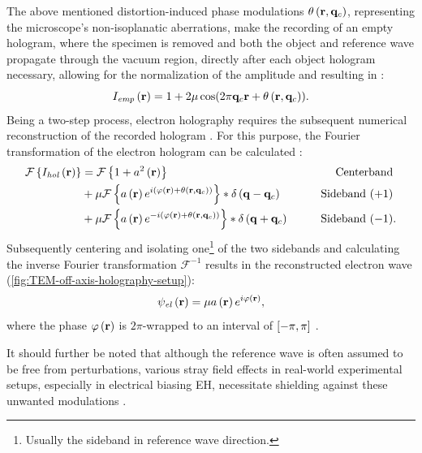 The above mentioned distortion-induced phase modulations $\theta\left(\vb{r}, \vb{q}_c\right)$, representing the microscope's non-isoplanatic aberrations, make the recording of an empty hologram, where the specimen is removed and both the object and reference wave propagate through the vacuum region, directly after each object hologram necessary, allowing for the normalization of the amplitude and resulting in \cite{Voelkl1999,Lehmann2002,Lichte2008}:
\begin{equation}
  I_{\mathit{emp}}\left(\vb{r}\right) = 1 + 2\mu \cos(2\pi \vb{q}_c \vb{r} + \theta\left(\vb{r}, \vb{q}_c\right)).
\end{equation}
Being a two-step process, electron holography requires the subsequent numerical reconstruction of the recorded hologram \cite{Voelkl1999,Lehmann2002,Lichte2008}. For this purpose, the Fourier transformation of the electron hologram can be calculated \cite{Lehmann1994,Voelkl1995,Voelkl1999,Lehmann2002,Lichte2008}:
	\begin{alignat}{3}
		\mathcal{F}\left\{ I_{\mathit{hol}}\left(\vb{r}\right) \right\} &= \mathcal{F}\left\{ 1 + a^2\left(\vb{r}\right) \right\} &\qquad\text{Centerband}& \notag \\
		&+ \mu \mathcal{F}\left\{ a\left(\vb{r}\right)e^{i\left(\varphi\left(\vb{r}\right) + \theta\left(\vb{r},\vb{q}_c\right)\right)} \right\} * \delta\left(\vb{q} - \vb{q}_c\right) &\quad\text{Sideband $\left(+1\right)$}& \notag \\
		&+ \mu \mathcal{F}\left\{ a\left(\vb{r}\right)e^{-i\left(\varphi\left(\vb{r}\right) + \theta\left(\vb{r},\vb{q}_c\right)\right)}\right\} * \delta\left(\vb{q} + \vb{q}_c\right) &\qquad\text{Sideband $\left(-1\right)$}&.
	\end{alignat}
Subsequently centering and isolating one\footnote{Usually the sideband in reference wave direction.} of the two sidebands and calculating the inverse Fourier transformation $\mathcal{F}^{-1}$ results in the reconstructed electron wave (\cref{fig:TEM-off-axis-holography-setup}):
\begin{equation}
	{\psi}_{\mathit{el}}\left(\vb{r}\right) = \mu a\left(\vb{r}\right)e^{i\varphi\left(\vb{r}\right)},
\end{equation}
where the phase $\varphi\left(\vb{r}\right)$ is $2\pi$-wrapped to an interval of $\interval{-\pi}{\pi}$ \cite{Lehmann1994,Voelkl1995,Voelkl1999,Lehmann2002,Lichte2008}.

It should further be noted that although the reference wave is often assumed to be free from perturbations, various stray field effects in real-world experimental setups, especially in electrical biasing EH, necessitate shielding against these unwanted modulations \cite{Wagner2019,Wagner2022}.

